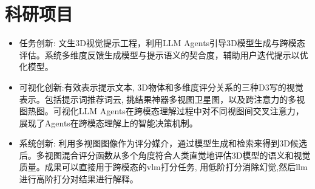 \documentclass[UTF8,AutoFakeBold]{resume}
\begin{document}
\section{\hspace{0.25em}\makebox[0.75em][c]{\faFlask} \fangsong\textbf{科研项目}}
    \begin{itemize}
    \item[\faThumbTack] \kaishu 任务创新: 文生3D视觉提示工程，利用LLM Agents引导3D模型生成与跨模态评估。系统多维度反馈生成模型与提示语义的契合度，辅助用户迭代提示以优化模型。
    \item[\faThumbTack] \kaishu 可视化创新:有效表示提示文本, 3D物体和多维度评分关系的三种D3写的视觉表示。包括提示词推荐词云, 挑结果神器多视图卫星图，以及跨注意力的多视图热图。可视化LLM Agents在跨模态理解过程中对不同视图间交叉注意力，展现了Agents在跨模态理解上的智能决策机制。
    \item[\faThumbTack] \kaishu 系统创新: 利用多视图图像作为评分媒介，通过模型生成和检索来得到3D候选后。多视图混合评分函数从多个角度符合人类直觉地评估3D模型的语义和视觉质量。成果可以直接用于跨模态的vlm打分任务, 用低阶打分消除幻觉,然后llm进行高阶打分对结果进行解释。
    \end{itemize}
\end{document}
